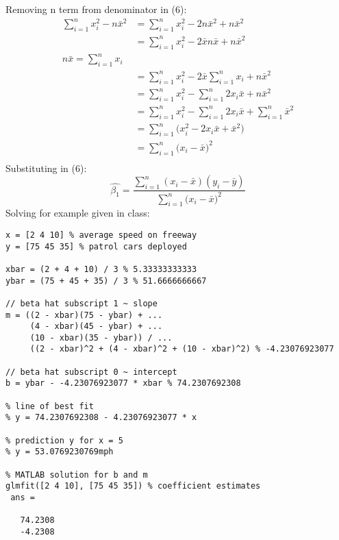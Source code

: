 \documentclass{article}
\begin{document}
Removing n term from denominator in (6):
\begin{align*}
\sum_{i=1}^{n}x_i^2 - n\bar{x}^2 & = \sum_{i=1}^{n}x_i^2 - 2n\bar{x}^2 + n\bar{x}^2 \\ %
& = \sum_{i=1}^{n}x_i^2 - 2\bar{x}n\bar{x} + n\bar{x}^2 \\ %
n\bar{x} = \sum_{i=1}^{n}x_i \\ %
& = \sum_{i=1}^{n}x_i^2 - 2\bar{x}\sum_{i=1}^{n}x_i + n\bar{x}^2 \\
& = \sum_{i=1}^{n}x_i^2 - \sum_{i=1}^{n}2x_i\bar{x} + n\bar{x}^2 \\
& = \sum_{i=1}^{n}x_i^2 - \sum_{i=1}^{n}2x_i\bar{x} + \sum_{i=1}^{n}\bar{x}^2 \\
& = \sum_{i=1}^{n}\big(x_i^2 - 2x_i\bar{x} + \bar{x}^2\big) \\
& = \sum_{i=1}^{n}\big(x_i - \bar{x}\big)^2 \\
\end{align*}
Substituting in (6):
\begin{equation}
\hat{\beta_1}=  \frac{\sum_{i=1}^{n}(x_i - \bar{x})(y_i - \bar{y})}{\sum_{i=1}^{n}\big(x_i - \bar{x}\big)^2}  \label{eq:7}
\end{equation}
Solving for example given in class:
\begin{verbatim}
x = [2 4 10] % average speed on freeway
y = [75 45 35] % patrol cars deployed

xbar = (2 + 4 + 10) / 3 % 5.33333333333
ybar = (75 + 45 + 35) / 3 % 51.6666666667

// beta hat subscript 1 ~ slope
m = ((2 - xbar)(75 - ybar) + ...
     (4 - xbar)(45 - ybar) + ...
     (10 - xbar)(35 - ybar)) / ...
     ((2 - xbar)^2 + (4 - xbar)^2 + (10 - xbar)^2) % -4.23076923077
     
// beta hat subscript 0 ~ intercept
b = ybar - -4.23076923077 * xbar % 74.2307692308

% line of best fit
% y = 74.2307692308 - 4.23076923077 * x

% prediction y for x = 5
% y = 53.0769230769mph

% MATLAB solution for b and m
glmfit([2 4 10], [75 45 35]) % coefficient estimates
 ans =

   74.2308
   -4.2308
\end{verbatim}
\end{document}
